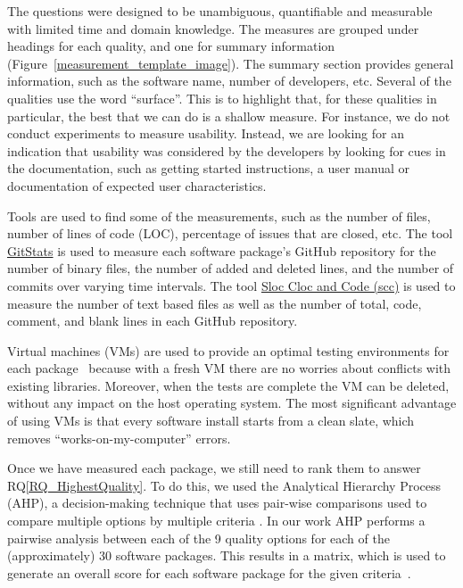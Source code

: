 \documentclass[runningheads]{llncs}
\newcommand{\rqref}[1]{RQ\ref{#1}}
\begin{document}
The questions were designed to be unambiguous, quantifiable and measurable with
limited time and domain knowledge. The measures are grouped under headings for
each quality, and one for summary information
(Figure~\ref{measurement_template_image}).   The summary section provides
general information, such as the software name, number of developers, etc.
Several of the qualities use the word ``surface''.  This is to highlight that,
for these qualities in particular, the best that we can do is a shallow measure.
For instance, we do not conduct experiments to measure usability. Instead, we
are looking for an indication that usability was considered by the developers by
looking for cues in the documentation, such as getting started instructions, a
user manual or documentation of expected user characteristics.

Tools are used to find some of the measurements, such as the number of files,
number of lines of code (LOC), percentage of issues that are closed, etc. The
tool \href{https://github.com/tomgi/git_stats}{GitStats} is used to measure
each software package's GitHub repository for the number of binary files, the
number of added and deleted lines, and the number of commits over varying time
intervals. The tool \href{https://github.com/boyter/scc}{Sloc Cloc and Code
(scc)} is used to measure the number of text based files as well as the number
of total, code, comment, and blank lines in each GitHub repository.

Virtual machines (VMs) are used to provide an optimal testing environments for
each package~\cite{SmithEtAl2016} because with a fresh VM there are no worries
about conflicts with existing libraries. Moreover, when the tests are complete
the VM can be deleted, without any impact on the host operating system. The most
significant advantage of using VMs is that every software install starts from a
clean slate, which removes ``works-on-my-computer'' errors.

Once we have measured each package, we still need to rank them to answer
\rqref{RQ_HighestQuality}.  To do this, we used the Analytical Hierarchy Process
(AHP), a decision-making technique that uses pair-wise comparisons used to
compare multiple options by multiple criteria \cite{Saaty1980}. In our work AHP
performs a pairwise analysis between each of the 9 quality options for each of
the (approximately) 30 software packages.  This results in a matrix, which is
used to generate an overall score for each software package for the given
criteria~\cite{SmithEtAl2016}.
\end{document}
